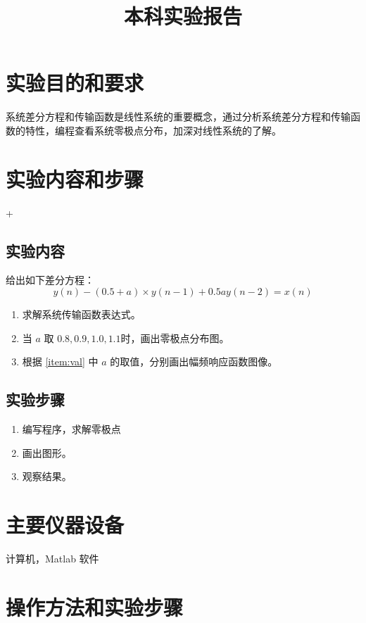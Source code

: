 \documentclass{zjureport}
\title{本科实验报告}
\date{\zhtoday}
\begin{document}
\makecover
\makeheader


\section{实验目的和要求}
系统差分方程和传输函数是线性系统的重要概念，通过分析系统差分方程和传输函数的特性，编程查看系统零极点分布，加深对线性系统的了解。
\section{实验内容和步骤}+

\subsection{实验内容}

给出如下差分方程：
$$y(n) - (0.5+a)\times y(n-1) + 0.5ay(n-2) = x(n)$$
\begin{enumerate}
    \item 求解系统传输函数表达式。
    \item 当 $a$ 取 $0.8, 0.9, 1.0, 1.1$时，画出零极点分布图。
          \label{item:val}
    \item 根据 \ref{item:val} 中 $a$ 的取值，分别画出幅频响应函数图像。
\end{enumerate}

\subsection{实验步骤}
\begin{enumerate}
    \item 编写程序，求解零极点
    \item 画出图形。
    \item 观察结果。
\end{enumerate}

\section{主要仪器设备}
计算机，Matlab 软件

\section{操作方法和实验步骤}
\end{document}
